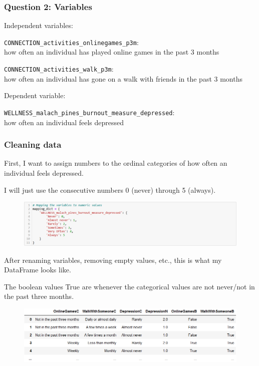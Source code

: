 \documentclass{beamer}
\begin{document}
\begin{frame}
    \frametitle{Question 2: Variables}
    
    Independent variables:
    
    \vspace{1em}
    
    {\small{\tt CONNECTION\_activities\_onlinegames\_p3m}:\\
    how often an individual has played online games in the past 3 months}
    
    \vspace{0.5em}
    
    {\small{\tt CONNECTION\_activities\_walk\_p3m}:\\
    how often an individual has gone on a walk with friends in the past 3 months}
    
    \vspace{1.5em}
    
    Dependent variable:

    \vspace{1em}
    
    {\small{\tt WELLNESS\_malach\_pines\_burnout\_measure\_depressed}:\\
    how often an individual feels depressed}
    
    
\end{frame}


\begin{frame}
    \frametitle{Cleaning data}

    First, I want to assign numbers to the ordinal categories of how often an individual feels depressed.

    I will just use the consecutive numbers 0 (never) through 5 (always).

    \begin{figure}
        \centering
        \includegraphics[width=0.8\linewidth]{jason_depressionvalues.png}
    \end{figure}

    After renaming variables, removing empty values, etc., this is what my DataFrame looks like.

    {\tiny The boolean values True are whenever the categorical values are not never/not in the past three months.}

    \begin{figure}
        \centering
        \includegraphics[width=0.7\linewidth]{jason_dfpreview.png}
    \end{figure}
    
\end{frame}
\end{document}
